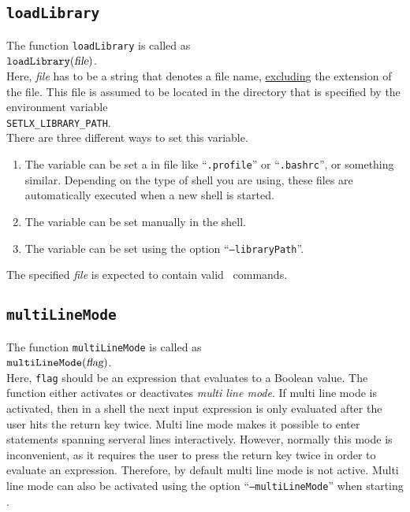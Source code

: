 \subsection{\texttt{loadLibrary}}
The function \texttt{loadLibrary}  is called as
\\[0.2cm]
\hspace*{1.3cm}
$\mathtt{loadLibrary}(\textsl{file})$.
\\[0.2cm]
Here, \textsl{file} has to be a string that denotes a file name, \underline{excludin}g  the extension
of the file.  This file is assumed to be located in the directory that is specified by the
environment variable 
\\[0.2cm]
\hspace*{1.3cm}
\texttt{SETLX\_LIBRARY\_PATH}.
\\[0.2cm]
There are three different ways to set this variable.
\begin{enumerate}
\item The variable can be  set a in file like ``\texttt{.profile}'' or
      ``\texttt{.bashrc}'', or something similar.  Depending on the type of shell you are
      using, these files are automatically executed when a new shell is started.
\item The variable can be set manually in the shell.
\item The variable can be set using the option ``\texttt{--libraryPath}''.
\end{enumerate}
The specified \textsl{file} is expected to contain valid \setlx\ commands.

\subsection{\texttt{multiLineMode}}
The function \texttt{multiLineMode}  is called as
\\[0.2cm]
\hspace*{1.3cm}
$\mathtt{multiLineMode}(\textsl{flag})$.
\\[0.2cm]
Here, \texttt{flag} should be an expression that evaluates to a  Boolean value.  The
function either activates or deactivates \emph{multi line mode}.  If multi line mode is
activated, then in a shell the next input expression is only evaluated after  the user
hits the return key twice.  Multi line mode makes it possible to enter statements spanning
serveral lines interactively.  However, normally this mode is inconvenient, as it requires
the user to press the return key twice in order to evaluate an expression.  Therefore, by
default multi line mode is not active.  Multi line mode can also be activated using the option 
``\texttt{--multiLineMode}'' when starting \setlx.

